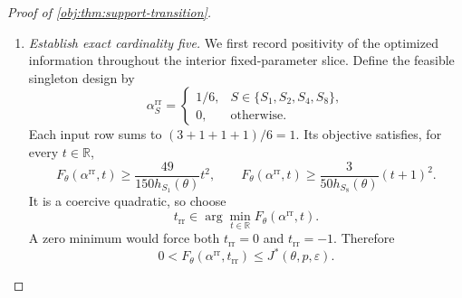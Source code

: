 \documentclass[11pt]{article}
\begin{document}
\begin{proof}[Proof of \cref{obj:thm:support-transition}]
\begin{enumerate}
For the certificate weights, the mixture representation gives
\[
F_\theta(\alpha^{(5)},t)
=\lambda(\alpha^{(5)})B_5(t)
 +(1-\lambda(\alpha^{(5)}))T_5(t).
\]
Its stationarity consequently implies
\[
\lambda(\alpha^{(5)})B_5'(t_{\mathrm{cert},5})
 +(1-\lambda(\alpha^{(5)}))T_5'(t_{\mathrm{cert},5})=0.
\]
The derivative difference is nonzero: if the two derivatives were equal, this equation would force \(T_5'(t_{\mathrm{cert},5})=0\). Solving gives
\[
\lambda(\alpha^{(5)})
=-\frac{T_5'(t_{\mathrm{cert},5})}
 {B_5'(t_{\mathrm{cert},5})-T_5'(t_{\mathrm{cert},5})}.
\]
For any feasible optimal \(\beta\), the preceding support-rigidity argument applies, and
\[
F_\theta(\beta,t_{\mathrm{cert},5})
=J^*=\inf_tF_\theta(\beta,t).
\]
Hence \(\beta\) is stationary at the same coordinate and satisfies the same mixture equation. Thus
\[
\lambda(\beta)=\lambda(\alpha^{(5)}),
\qquad
\beta=\alpha^{(5)}.
\]
This proves the required uniqueness among all feasible optimal weights.

\item \emph{Establish exact cardinality five.}
We first record positivity of the optimized information throughout the interior fixed-parameter slice. Define the feasible singleton design by
\[
\alpha^{\mathrm{rr}}_S=
\begin{cases}
1/6,&S\in\{S_1,S_2,S_4,S_8\},\\
0,&\text{otherwise}.
\end{cases}
\]
Each input row sums to \((3+1+1+1)/6=1\). Its objective satisfies, for every \(t\in\mathbb R\),
\[
F_\theta(\alpha^{\mathrm{rr}},t)
\ge\frac{49}{150h_{S_1}(\theta)}t^2,
\qquad
F_\theta(\alpha^{\mathrm{rr}},t)
\ge\frac{3}{50h_{S_8}(\theta)}(t+1)^2.
\]
It is a coercive quadratic, so choose
\[
t_{\mathrm{rr}}\in\arg\min_{t\in\mathbb R}
F_\theta(\alpha^{\mathrm{rr}},t).
\]
A zero minimum would force both \(t_{\mathrm{rr}}=0\) and
\(t_{\mathrm{rr}}=-1\). Therefore
\[
0<F_\theta(\alpha^{\mathrm{rr}},t_{\mathrm{rr}})
\le J^*(\theta,p,\varepsilon).
\]


\end{enumerate}
\end{proof}
\end{document}
